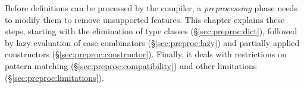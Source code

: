 
\noindent
Before definitions can be processed by the compiler, a \emph{preprocessing} phase needs to modify them to remove unsupported features.
This chapter explains these steps, starting with the elimination of type classes (§\ref{sec:preproc:dict}), followed by lazy evaluation of case combinators (§\ref{sec:preproc:lazy}) and partially applied constructors (§\ref{sec:preproc:constructor}).
Finally, it deals with restrictions on pattern matching (§\ref{sec:preproc:compatibility}) and other limitations (§\ref{sec:preproc:limitations}).